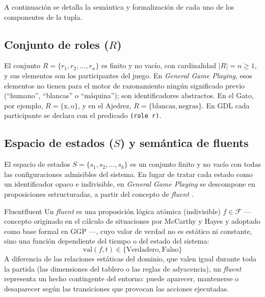 A continuación se detalla la semántica y formalización de cada uno de los componentes de la tupla.

\subsection{Conjunto de roles (\texorpdfstring{$R$}{R})}

El conjunto $R = \{r_1, r_2, \dots, r_n\}$ es finito y no vacío, con cardinalidad $|R| = n \ge 1$, y sus elementos son los participantes del juego. En \textit{General Game Playing}, esos elementos no tienen para el motor de razonamiento ningún significado previo (``humano'', ``blancas'' o ``máquina''); son identificadores abstractos. En el Gato, por ejemplo, $R = \{\text{x}, \text{o}\}$, y en el Ajedrez, $R = \{\text{blancas}, \text{negras}\}$. En GDL cada participante se declara con el predicado \texttt{(role r)}.

\subsection{Espacio de estados (\texorpdfstring{$S$}{S}) y semántica de fluents}
\label{subsec:fluents}

El espacio de estados $S = \{s_1, s_2, \dots, s_k\}$ es un conjunto finito y no vacío con todas las configuraciones admisibles del sistema. En lugar de tratar cada estado como un identificador opaco e indivisible, en \textit{General Game Playing} se descompone en proposiciones estructuradas, a partir del concepto de \textit{fluent} \cite{McCarthyHayes1969, GeneserethThielscher2014}.

\begin{definicion}{Fluent}{fluent}
Un \textit{fluent} es una proposición lógica atómica (indivisible) $f \in \mathcal{F}$ ---concepto originado en el cálculo de situaciones por McCarthy y Hayes \cite{McCarthyHayes1969} y adoptado como base formal en GGP \cite{Love2008GDL, GeneserethThielscher2014}---, cuyo valor de verdad no es estático ni constante, sino una función dependiente del tiempo o del estado del sistema:
\begin{equation*}
    \text{val}(f, t) \in \{\text{Verdadero}, \text{Falso}\}
\end{equation*}
A diferencia de las relaciones estáticas del dominio, que valen igual durante toda la partida (las dimensiones del tablero o las reglas de adyacencia), un \textit{fluent} representa un hecho contingente del entorno: puede aparecer, mantenerse o desaparecer según las transiciones que provocan las acciones ejecutadas.
\end{definicion}

